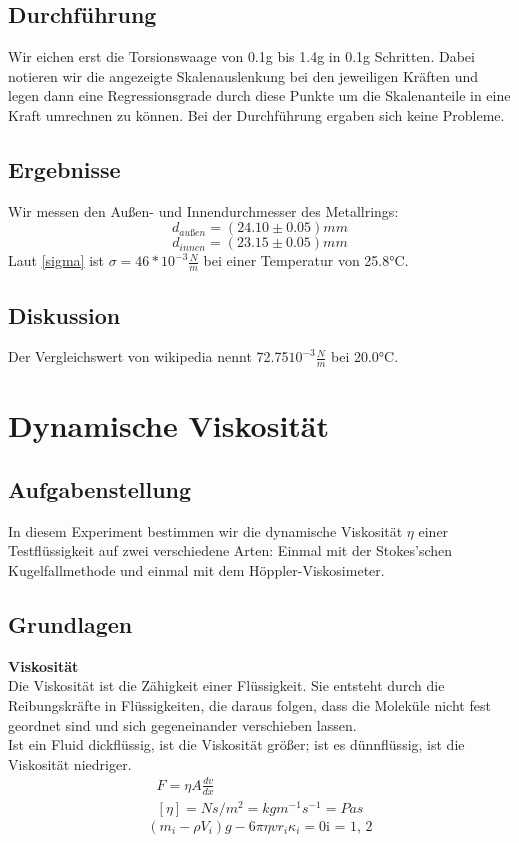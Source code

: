 \documentclass{article}
\begin{document}
\subsection{Durchführung}
Wir eichen erst die Torsionswaage von 0.1g bis 1.4g in 0.1g Schritten. Dabei notieren wir die angezeigte Skalenauslenkung bei den jeweiligen Kräften und legen dann eine Regressionsgrade durch diese Punkte um die Skalenanteile in eine Kraft umrechnen zu können.
Bei der Durchführung ergaben sich keine Probleme.
\subsection{Ergebnisse}
Wir messen den Außen- und Innendurchmesser des Metallrings: 
$$d_{außen}=(24.10\pm0.05)mm$$
$$d_{innen}=(23.15\pm0.05)mm$$
Laut \ref{sigma} ist $\sigma=46*10^{-3}\frac{N}{m}$ bei einer Temperatur von 25.8°C. 
\subsection{Diskussion}
Der Vergleichswert von wikipedia nennt 72.75$10^{-3}\frac{N}{m}$ bei 20.0°C.
\section{Dynamische Viskosität}
\subsection{Aufgabenstellung}
In diesem Experiment bestimmen wir die dynamische Viskosität $\eta$ einer Testflüssigkeit auf zwei verschiedene Arten: Einmal mit der Stokes'schen Kugelfallmethode und einmal mit dem Höppler-Viskosimeter.
\subsection{Grundlagen}
\textbf{Viskosität}\\
Die Viskosität ist die Zähigkeit einer Flüssigkeit. Sie entsteht durch die Reibungskräfte in Flüssigkeiten, die daraus folgen, dass die Moleküle nicht fest geordnet sind und sich gegeneinander verschieben lassen.\\
Ist ein Fluid dickflüssig, ist die Viskosität größer; ist es dünnflüssig, ist die Viskosität niedriger.\\
\begin{gather}
F=\eta A \frac{dv}{dx}\\
[\eta]=N s/m^2 = kg m^{-1}s^{-1} = Pa s
\end{gather}
\begin{equation}
\label{stokes}
(m_i-\rho V_i)g - 6\pi\eta v r_i \kappa_i = 0 \text{i = 1, 2}
\end{equation}
\end{document}
